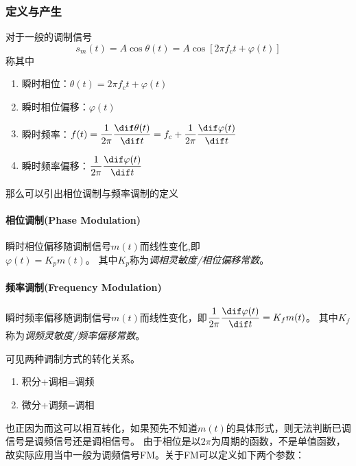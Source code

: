     \subsubsection{定义与产生}
    对于一般的调制信号
    \begin{equation}
        s_m(t)=A\cos\theta(t)=A\cos[2\pi f_c t+\varphi(t)]
    \end{equation}
    称其中
    \begin{enumerate}[itemsep=0pt,parsep=2ex,label=\color{bupt}\arabic*、,labelsep=0pt,leftmargin=4em]
        \item 瞬时相位：$\theta(t)=2\pi f_c t+\varphi(t)$
        \item 瞬时相位偏移：$\varphi(t)$
        \item 瞬时频率：$f(t)=\dfrac{1}{2\pi}\dfrac{\dif \theta(t)}{\dif t}=f_c+\dfrac{1}{2\pi}\dfrac{\dif \varphi(t)}{\dif t}$
        \item 瞬时频率偏移：$\dfrac{1}{2\pi}\dfrac{\dif \varphi(t)}{\dif t}$
    \end{enumerate}

    那么可以引出相位调制与频率调制的定义
    \paragraph{相位调制(Phase Modulation)}瞬时相位偏移随调制信号$m(t)$而线性变化,即\\ $\varphi(t)=K_pm(t)$。
    其中$K_p$称为\emph{调相灵敏度/相位偏移常数}。

    \paragraph{频率调制(Frequency Modulation)}瞬时频率偏移随调制信号$m(t)$而线性变化，即$\dfrac{1}{2\pi}\dfrac{\dif \varphi(t)}{\dif t}=K_fm(t)$。
    其中$K_f$称为\emph{调频灵敏度/频率偏移常数}。

    \vspace{2ex}
    可见两种调制方式的转化关系。
    \begin{enumerate}[itemsep=0pt,parsep=0ex,label=\color{bupt}$\cdot$,labelsep=0pt,leftmargin=4em]
        \item 积分+调相=调频
        \item 微分+调频=调相
    \end{enumerate}
    
    也正因为而这可以相互转化，如果预先不知道$m(t)$的具体形式，则无法判断已调信号是调频信号还是调相信号。
    由于相位是以$2\pi$为周期的函数，不是单值函数，故实际应用当中一般为调频信号FM。关于FM可以定义如下两个参数：

